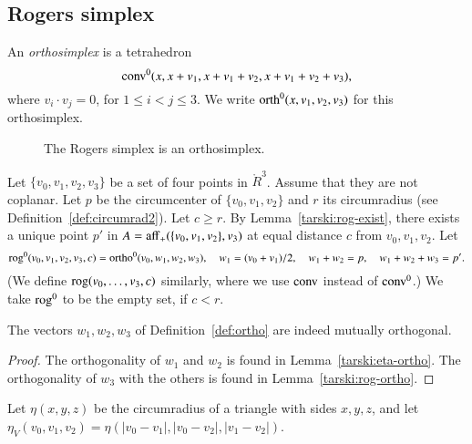 \subsection{Rogers simplex}

\begin{definition} 
An {\it orthosimplex} is a tetrahedron
    $${\operatorname{conv}}^0(x,x+v_1,x+v_1+v_2,x+v_1+v_2+v_3),$$
where $v_i\cdot v_j=0$, for $1\le i<j\le 3$.   We write
${\operatorname{orth}}^0(x,v_1,v_2,v_3)$ for this orthosimplex.
\end{definition}

\begin{figure}[htb]
  \centering
  \caption{The Rogers simplex is an orthosimplex.}
\end{figure}


\begin{definition} 
Let $\{v_0,v_1,v_2,v_3\}$ be a set of four points in $\ring{R}^3$.
Assume that they are not coplanar.  Let $p$ be the circumcenter
of $\{v_0,v_1,v_2\}$ and $r$ its circumradius (see Definition~\ref{def:circumrad2}).  Let $c\ge r$.
By Lemma~\ref{tarski:rog-exist}, there exists a unique
point $p'$ in $A={\operatorname{aff}}_+(\{v_0,v_1,v_2\},v_3)$ at equal distance $c$
from $v_0,v_1,v_2$.
Let $$
    {\operatorname{rog}}^0(v_0,v_1,v_2,v_3,c) = 
    {\operatorname{ortho}}^0(v_0,w_1,w_2,w_3),
    \quad w_1=(v_0+v_1)/2,\quad w_1+w_2=p,\quad w_1+w_2+w_3=p'.
    $$
(We define ${\operatorname{rog}}(v_0,\ldots,v_3,c)$ similarly, where we use
${\operatorname{conv}}$ instead of ${\operatorname{conv}}^0$.)
We take ${\operatorname{rog}}^0$ to be the empty set, if $c< r$.
\end{definition}

\begin{lemma} The vectors $w_1,w_2,w_3$ of Definition~\ref{def:ortho}
are indeed mutually orthogonal.
\end{lemma}

\begin{proof} The orthogonality of $w_1$ and $w_2$ is found in
Lemma~\ref{tarski:eta-ortho}.  The orthogonality of $w_3$ with the
others is found in Lemma~\ref{tarski:rog-ortho}.
\end{proof}

\begin{definition}
Let $\eta(x,y,z)$ be the circumradius of a triangle with sides
$x,y,z$, and let $\eta_V(v_0,v_1,v_2) = \eta(|v_0-v_1|,|v_0-v_2|,|v_1-v_2|)$.
\end{definition}

